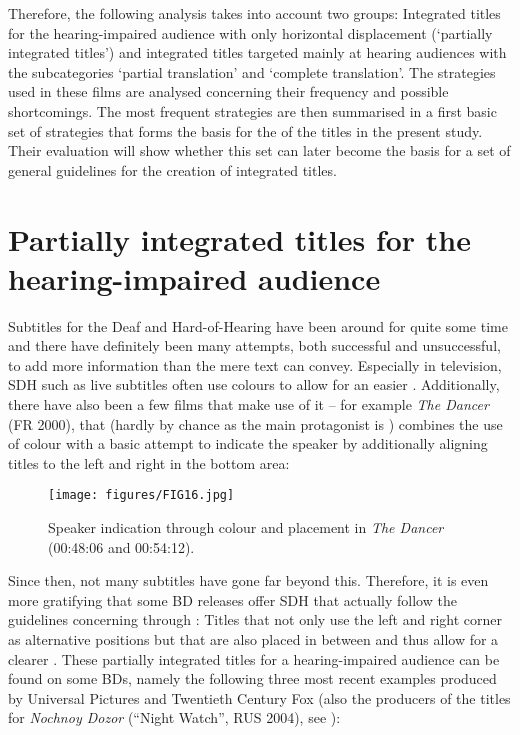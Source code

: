 Therefore, the following analysis takes into account two groups: Integrated titles for the hearing-impaired audience with only horizontal displacement (‘partially integrated titles’) and integrated titles targeted mainly at hearing audiences with the subcategories ‘partial translation’ and ‘complete translation’. The  strategies used in these films are analysed concerning their frequency and possible shortcomings. The most frequent strategies are then summarised in a first basic set of  strategies that forms the basis for the  of the titles in the present study. Their evaluation will show whether this set can later become the basis for a set of general guidelines for the creation of integrated titles.

\section{Partially integrated titles for the hearing-impaired audience}\label{sec:4.1}

Subtitles for the Deaf and Hard-of-Hearing have been around for quite some time and there have definitely been many attempts, both successful and unsuccessful, to add more information than the mere text can convey. Especially in television, SDH such as live subtitles often use colours to allow for an easier . Additionally, there have also been a few films that make use of it – for example \textit{The Dancer} (FR 2000), that (hardly by chance as the main protagonist is ) combines the use of colour with a basic attempt to indicate the speaker by additionally aligning titles to the left and right in the bottom area:

\begin{figure}
\texttt{[image: figures/FIG16.jpg]}
\caption{Speaker indication through colour and placement in \textit{The Dancer} (00:48:06 and 00:54:12).}
\label{fig:FIG16}
\end{figure}

Since then, not many subtitles have gone far beyond this. Therefore, it is even more gratifying that some BD releases offer SDH that actually follow the guidelines concerning  through : Titles that not only use the left and right corner as alternative positions but that are also placed in between and thus allow for a clearer . These partially integrated titles for a hearing-impaired audience can be found on some BDs, namely the following three most recent examples produced by Universal Pictures and Twentieth Century Fox (also the producers of the titles for \textit{Nochnoy Dozor} (“Night Watch”, RUS 2004), see ):

